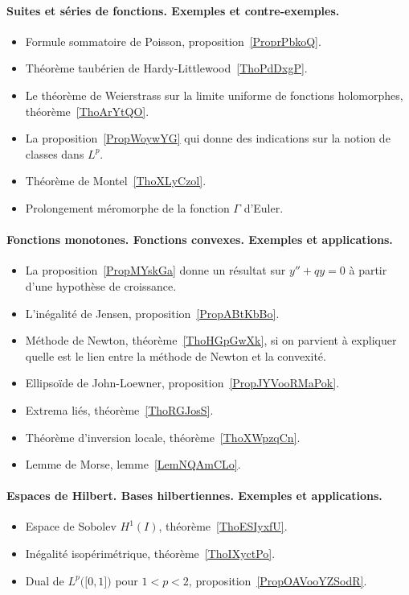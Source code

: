 \paragraph{Suites et séries de fonctions. Exemples et contre-exemples.}
\begin{itemize}
    \item Formule sommatoire de Poisson, proposition~\ref{ProprPbkoQ}.
    \item Théorème taubérien de Hardy-Littlewood~\ref{ThoPdDxgP}.
    \item Le théorème de Weierstrass sur la limite uniforme de fonctions holomorphes, théorème~\ref{ThoArYtQO}.
    \item La proposition~\ref{PropWoywYG} qui donne des indications sur la notion de classes dans \( L^p\).
    \item Théorème de Montel~\ref{ThoXLyCzol}.
    \item Prolongement méromorphe de la fonction \( \Gamma\) d'Euler.
\end{itemize}

\paragraph{Fonctions monotones. Fonctions convexes. Exemples et applications.}
\begin{itemize}
    \item La proposition~\ref{PropMYskGa} donne un résultat sur \( y''+qy=0\) à partir d'une hypothèse de croissance.
    \item L'inégalité de Jensen, proposition~\ref{PropABtKbBo}.
    \item Méthode de Newton, théorème~\ref{ThoHGpGwXk}, si on parvient à expliquer quelle est le lien entre la méthode de Newton et la convexité.
    \item Ellipsoïde de John-Loewner, proposition~\ref{PropJYVooRMaPok}.
\end{itemize}

\begin{itemize}
    \item Extrema liés, théorème~\ref{ThoRGJosS}.
    \item Théorème d'inversion locale, théorème~\ref{ThoXWpzqCn}.
    \item Lemme de Morse, lemme~\ref{LemNQAmCLo}.
\end{itemize}

\paragraph{Espaces de Hilbert. Bases hilbertiennes. Exemples et applications.}
\begin{itemize}
    \item Espace de Sobolev \( H^1(I)\), théorème~\ref{ThoESIyxfU}.
    \item Inégalité isopérimétrique, théorème~\ref{ThoIXyctPo}.
    \item Dual de \( L^p\big( \mathopen[ 0 , 1 \mathclose] \big)\) pour \( 1<p<2\), proposition~\ref{PropOAVooYZSodR}.
\end{itemize}

